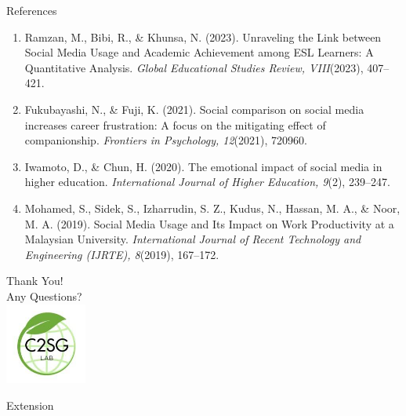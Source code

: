 \documentclass{beamer}
\begin{document}
\begin{frame}{References}
% 
    \begin{enumerate}
        
        \item Ramzan, M., Bibi, R., \& Khunsa, N. (2023). Unraveling the Link between Social Media Usage and Academic Achievement among ESL Learners: A Quantitative Analysis. \textit{Global Educational Studies Review, VIII}(2023), 407–421.
        \item Fukubayashi, N., \& Fuji, K. (2021). Social comparison on social media increases career frustration: A focus on the mitigating effect of companionship. \textit{Frontiers in Psychology, 12}(2021), 720960.
        \item Iwamoto, D., \& Chun, H. (2020). The emotional impact of social media in higher education. \textit{International Journal of Higher Education, 9}(2), 239–247.
        \item Mohamed, S., Sidek, S., Izharrudin, S. Z., Kudus, N., Hassan, M. A., \& Noor, M. A. (2019). Social Media Usage and Its Impact on Work Productivity at a Malaysian University. \textit{International Journal of Recent Technology and Engineering (IJRTE), 8}(2019), 167–172.
    \end{enumerate}
\end{frame}



\begin{frame}
    \begin{center}
        \Huge Thank You! \\
        \vspace{1cm}
        \Large Any Questions? \\
        \vspace{0.5cm}
        \includegraphics[width=0.2\textwidth]{c2sghhh.jpg} %
    \end{center}
\end{frame}

\begin{frame}{Extension}
    
\end{frame}
\end{document}
